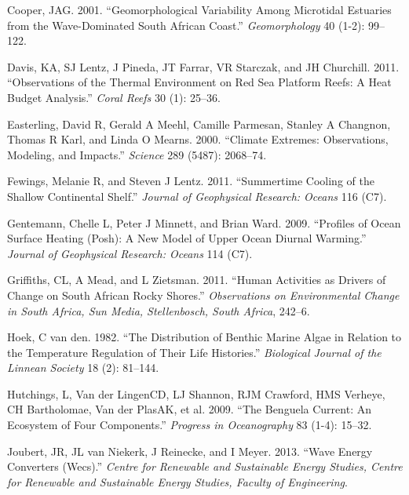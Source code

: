 \documentclass[10pt,a4paper,]{article}
\begin{document}
\leavevmode\hypertarget{ref-Cooper2001}{}%
Cooper, JAG. 2001. ``Geomorphological Variability Among Microtidal
Estuaries from the Wave-Dominated South African Coast.''
\emph{Geomorphology} 40 (1-2): 99--122.

\leavevmode\hypertarget{ref-Davis2011}{}%
Davis, KA, SJ Lentz, J Pineda, JT Farrar, VR Starczak, and JH Churchill.
2011. ``Observations of the Thermal Environment on Red Sea Platform
Reefs: A Heat Budget Analysis.'' \emph{Coral Reefs} 30 (1): 25--36.

\leavevmode\hypertarget{ref-Easterling2000}{}%
Easterling, David R, Gerald A Meehl, Camille Parmesan, Stanley A
Changnon, Thomas R Karl, and Linda O Mearns. 2000. ``Climate Extremes:
Observations, Modeling, and Impacts.'' \emph{Science} 289 (5487):
2068--74.

\leavevmode\hypertarget{ref-Fewings2011}{}%
Fewings, Melanie R, and Steven J Lentz. 2011. ``Summertime Cooling of
the Shallow Continental Shelf.'' \emph{Journal of Geophysical Research:
Oceans} 116 (C7).

\leavevmode\hypertarget{ref-Gentemann2009}{}%
Gentemann, Chelle L, Peter J Minnett, and Brian Ward. 2009. ``Profiles
of Ocean Surface Heating (Posh): A New Model of Upper Ocean Diurnal
Warming.'' \emph{Journal of Geophysical Research: Oceans} 114 (C7).

\leavevmode\hypertarget{ref-Griffiths2011}{}%
Griffiths, CL, A Mead, and L Zietsman. 2011. ``Human Activities as
Drivers of Change on South African Rocky Shores.'' \emph{Observations on
Environmental Change in South Africa, Sun Media, Stellenbosch, South
Africa}, 242--6.

\leavevmode\hypertarget{ref-Hoek1982}{}%
Hoek, C van den. 1982. ``The Distribution of Benthic Marine Algae in
Relation to the Temperature Regulation of Their Life Histories.''
\emph{Biological Journal of the Linnean Society} 18 (2): 81--144.

\leavevmode\hypertarget{ref-Hutchings2009}{}%
Hutchings, L, Van der LingenCD, LJ Shannon, RJM Crawford, HMS Verheye,
CH Bartholomae, Van der PlasAK, et al. 2009. ``The Benguela Current: An
Ecosystem of Four Components.'' \emph{Progress in Oceanography} 83
(1-4): 15--32.

\leavevmode\hypertarget{ref-Joubert2013}{}%
Joubert, JR, JL van Niekerk, J Reinecke, and I Meyer. 2013. ``Wave
Energy Converters (Wecs).'' \emph{Centre for Renewable and Sustainable
Energy Studies, Centre for Renewable and Sustainable Energy Studies,
Faculty of Engineering}.
\end{document}
